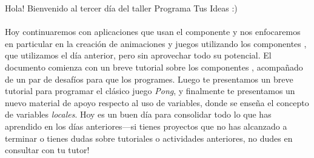 Hola! Bienvenido al tercer día del taller Programa Tus Ideas :)

\paragraph{}
Hoy continuaremos con aplicaciones que usan el componente
 y nos enfocaremos en particular en la creación de
animaciones y juegos utilizando los componentes
, que utilizamos el día anterior, pero sin
aprovechar todo su potencial. El documento comienza con un breve
tutorial sobre los componentes , acompañado de
un par de desafíos para que los programes. Luego te presentamos un
breve tutorial para programar el clásico juego \emph{Pong}, y
finalmente te presentamos un nuevo material de apoyo respecto al uso
de variables, donde se enseña el concepto de variables
\emph{locales}. Hoy es un buen día para consolidar todo lo que has
aprendido en los días anteriores---si tienes proyectos que no has
alcanzado a terminar o tienes dudas sobre tutoriales o actividades
anteriores, no dudes en consultar con tu tutor!

